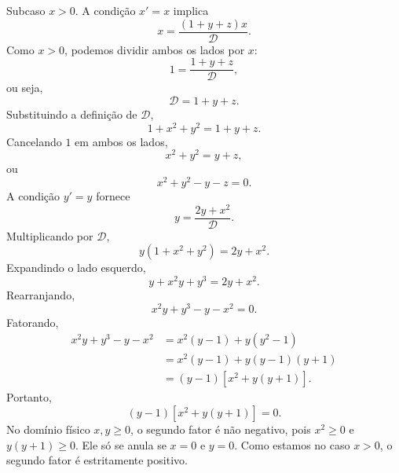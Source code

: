 \documentclass[12pt,a4paper]{article}
\begin{document}
%
Subcaso \(x>0\). A condição \(x'=x\) implica
%
\begin{equation}
    x
    =
    \frac{(1+y+z)x}{\mathcal D}.
\end{equation}
%
Como \(x>0\), podemos dividir ambos os lados por \(x\):
%
\begin{equation}
    1
    =
    \frac{1+y+z}{\mathcal D},
\end{equation}
%
ou seja,
%
\begin{equation}
    \mathcal D=1+y+z.
    \label{eq:D_eq_p4}
\end{equation}
%
Substituindo a definição de \(\mathcal D\),
%
\begin{equation}
    1+x^2+y^2
    =
    1+y+z.
\end{equation}
%
Cancelando \(1\) em ambos os lados,
%
\begin{equation}
    x^2+y^2
    =
    y+z,
\end{equation}
%
ou
%
\begin{equation}
    x^2+y^2-y-z=0.
    \label{eq:fp1}
\end{equation}
%
A condição \(y'=y\) fornece
%
\begin{equation}
    y
    =
    \frac{2y+x^2}{\mathcal D}.
\end{equation}
%
Multiplicando por \(\mathcal D\),
%
\begin{equation}
    y(1+x^2+y^2)
    =
    2y+x^2.
\end{equation}
%
Expandindo o lado esquerdo,
%
\begin{equation}
    y+x^2y+y^3
    =
    2y+x^2.
\end{equation}
%
Rearranjando,
%
\begin{equation}
    x^2y+y^3-y-x^2=0.
\end{equation}
%
Fatorando,
%
\begin{align}
    x^2y+y^3-y-x^2
    &=
    x^2(y-1)+y(y^2-1)
    \nonumber\\[4pt]
    &=
    x^2(y-1)+y(y-1)(y+1)
    \nonumber\\[4pt]
    &=
    (y-1)\left[
        x^2+y(y+1)
    \right].
\end{align}
%
Portanto,
%
\begin{equation}
    (y-1)
    \left[
        x^2+y(y+1)
    \right]
    =0.
    \label{eq:fp2}
\end{equation}
%
No domínio físico \(x,y\ge0\), o segundo fator é não negativo, pois
\(x^2\ge0\) e \(y(y+1)\ge0\). Ele só se anula se \(x=0\) e \(y=0\).
Como estamos no caso \(x>0\), o segundo fator é estritamente positivo.
\end{document}
